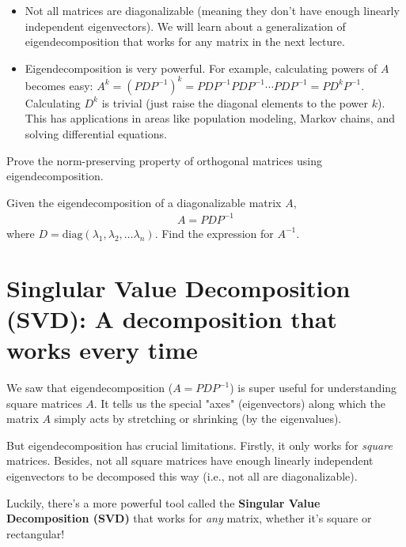 \documentclass[11pt]{article}
\begin{document}
\begin{remark}
\begin{itemize}
    \item Not all matrices are diagonalizable (meaning they don't have enough linearly independent eigenvectors). We will learn about a generalization of eigendecomposition that works for any matrix in the next lecture.
    \item Eigendecomposition is very powerful. For example, calculating powers of $A$ becomes easy: $A^k = (PDP^{-1})^k = P D P^{-1} P D P^{-1} \cdots P D P^{-1} = P D^k P^{-1}$. Calculating $D^k$ is trivial (just raise the diagonal elements to the power $k$). This has applications in areas like population modeling, Markov chains, and solving differential equations.
\end{itemize}
\end{remark}

\begin{exercise}
    Prove the norm-preserving property of orthogonal matrices using eigendecomposition.
\end{exercise}

\begin{exercise}
    Given the eigendecomposition of a diagonalizable matrix $A$, 
    \begin{align*}
        A = PDP^{-1}
    \end{align*}
    where $D = \text{diag}(\lambda_1, \lambda_2, \dots \lambda_n)$.
    Find the expression for $A^{-1}$.
\end{exercise}

\section{Singlular Value Decomposition (SVD): A decomposition that works every time}
We saw that eigendecomposition ($A = PDP^{-1}$) is super useful for understanding square matrices $A$. It tells us the special "axes" (eigenvectors) along which the matrix $A$ simply acts by stretching or shrinking (by the eigenvalues).

But eigendecomposition has crucial limitations. Firstly, it only works for \textit{square} matrices. Besides, not all square matrices have enough linearly independent eigenvectors to be decomposed this way (i.e., not all are diagonalizable).

Luckily, there's a more powerful tool called the \textbf{Singular Value Decomposition (SVD)} that works for \textit{any} matrix, whether it's square or rectangular!
\end{document}
